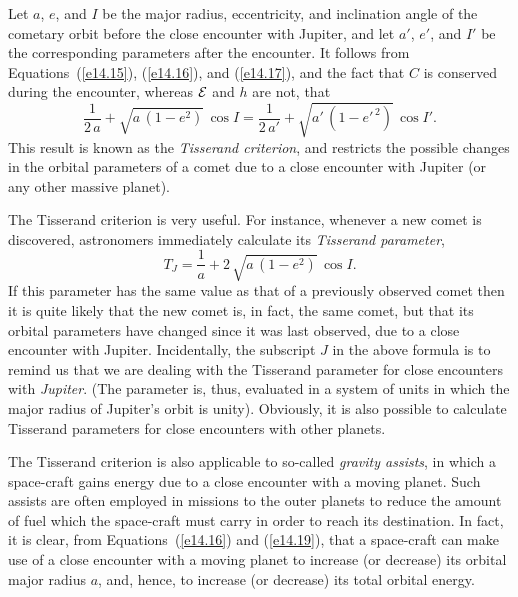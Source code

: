 Let $a$, $e$, and $I$ be the major radius, eccentricity, and inclination angle of the cometary
orbit before the close encounter with Jupiter, and let $a'$, $e'$, and $I'$ be the corresponding
parameters after the encounter. It follows from Equations~(\ref{e14.15}), (\ref{e14.16}), and
(\ref{e14.17}), and the fact that $C$ is conserved during the encounter, whereas
${\cal E}$ and $h$ are not, that
\begin{equation}\label{e14.19}
\frac{1}{2\,a} + \sqrt{a\,(1-e^2)}\,\cos I = \frac{1}{2\,a'} + \sqrt{a'\,(1-e'^{\,2})}\,\cos I'.
\end{equation}
This result is known as the {\em Tisserand criterion}, and restricts the possible changes in the
orbital parameters of a comet due to a close encounter with Jupiter (or any other
massive planet).

The Tisserand criterion is very useful. For instance, whenever a new comet is discovered, astronomers
immediately calculate its {\em Tisserand parameter},
\begin{equation}
T_J = \frac{1}{a} + 2\,\sqrt{a\,(1-e^2)}\,\cos I.
\end{equation}
If this parameter has the same value as that of a previously observed comet then it
is quite likely that the new comet is, in fact, the same comet, but that
its orbital parameters have changed since it was last observed, due to a close encounter with Jupiter. Incidentally,
the subscript $J$ in the above formula is to remind us that we are dealing with the
Tisserand parameter for close encounters with {\em Jupiter}. (The parameter is, thus, evaluated
in a system of units in which the major radius of Jupiter's orbit is unity). Obviously,
it is also possible to calculate Tisserand parameters for close encounters with other planets.

The Tisserand criterion is also applicable to so-called {\em gravity assists}, in which a
space-craft gains energy due to a close encounter with a moving planet. Such assists
are often employed in missions to the outer planets  to reduce the amount of fuel
which the space-craft must carry in order to reach its destination. In fact, it is clear,
from Equations~(\ref{e14.16}) and (\ref{e14.19}), that a space-craft can make use of  a close encounter
with a moving planet to increase (or decrease) its orbital major radius $a$, and, hence, to increase
(or decrease)
its total orbital energy. 

